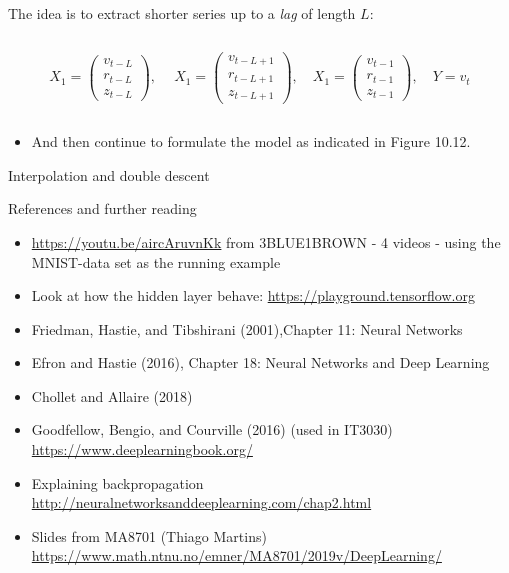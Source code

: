 \documentclass[
  10pt,
  ignorenonframetext,
]{beamer}
\providecommand{\tightlist}{%
  \setlength{\itemsep}{0pt}\setlength{\parskip}{0pt}}
\begin{document}
\begin{frame}
The idea is to extract shorter series up to a \emph{lag} of length
\(L\):

\(~\)

\[X_1 = \left( 
\begin{matrix}
v_{t-L}\\
r_{t-L}\\
z_{t-L}
\end{matrix}
\right), \ 
\quad X_1 = \left( 
\begin{matrix}
v_{t-L+1}\\
r_{t-L+1}\\
z_{t-L+1}
\end{matrix}
\right), 
\quad 
X_1 = \left( 
\begin{matrix}
v_{t-1}\\
r_{t-1}\\
z_{t-1}
\end{matrix}
\right), 
\quad 
Y = v_t\]

\(~\)

\begin{itemize}
\tightlist
\item
  And then continue to formulate the model as indicated in Figure 10.12.
\end{itemize}
\end{frame}

\begin{frame}{Interpolation and double descent}
\protect\hypertarget{interpolation-and-double-descent}{}
\end{frame}

\begin{frame}{References and further reading}
\protect\hypertarget{references-and-further-reading}{}
\begin{itemize}
\tightlist
\item
  \url{https://youtu.be/aircAruvnKk} from 3BLUE1BROWN - 4 videos - using
  the MNIST-data set as the running example
\item
  Look at how the hidden layer behave:
  \url{https://playground.tensorflow.org}
\item
  Friedman, Hastie, and Tibshirani (2001),Chapter 11: Neural Networks
\item
  Efron and Hastie (2016), Chapter 18: Neural Networks and Deep Learning
\item
  Chollet and Allaire (2018)
\item
  Goodfellow, Bengio, and Courville (2016) (used in IT3030)
  \url{https://www.deeplearningbook.org/}
\item
  Explaining backpropagation
  \url{http://neuralnetworksanddeeplearning.com/chap2.html}
\item
  Slides from MA8701 (Thiago Martins)
  \url{https://www.math.ntnu.no/emner/MA8701/2019v/DeepLearning/}
\end{itemize}
\end{frame}
\end{document}
